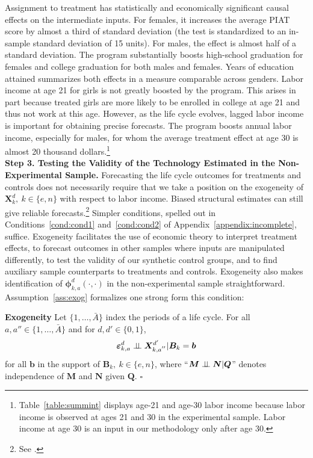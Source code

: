 Assignment to treatment has statistically and economically significant causal effects on the intermediate inputs. For females, it increases the average PIAT score by almost a third of standard deviation (the test is standardized to an in-sample standard deviation of 15 units). For males, the effect is almost half of a standard deviation. The program substantially boosts high-school graduation for females and college graduation for both males and females. Years of education attained summarizes both effects in a measure comparable across genders. Labor income at age 21 for girls is not greatly boosted by the program. This arises in part because treated girls are more likely to be enrolled in college at age 21 and thus not work at this age. However, as the life cycle evolves, lagged labor income is important for obtaining precise forecasts. The program boosts annual labor income, especially for males, for whom the average treatment effect at age 30 is almost 20 thousand dollars.\footnote{Table~\ref{table:summint} displays age-21 and age-30 labor income because labor income is observed at ages 21 and 30 in the experimental sample. Labor income at age 30 is an input in our methodology only after age 30.}\\

\noindent \textbf{Step 3. Testing the Validity of the Technology Estimated in the Non-Experimental Sample.} Forecasting the life cycle outcomes for treatments and controls does not necessarily require that we take a position on the exogeneity of $\bm{X}^d_k, \: k \in \{e,n\}$ with respect to labor income. Biased structural estimates can still give reliable forecasts.\footnote{See \cite{Liu-etal-2016-USC-Data-Models}.} Simpler conditions, spelled out in Conditions~\ref{cond:cond1} and~\ref{cond:cond2} of Appendix~\ref{appendix:incomplete}, suffice. Exogeneity facilitates the use of economic theory to interpret treatment effects, to forecast outcomes in other samples where inputs are manipulated differently, to test the validity of our synthetic control groups, and to find auxiliary sample counterparts to treatments and controls. Exogeneity also makes identification of $\bm{\phi}^d_{k,a}\left( \cdot, \cdot \right)$ in the non-experimental sample straightforward. Assumption~\ref{ass:exog} formalizes one strong form this condition:

\onehalfspacing
\begin{assumption}\label{ass:exog} \textbf{Exogeneity}
Let $\{ 1, \ldots, \bar{A} \}$ index the periods of a life cycle. For all $a, a'' \in \{ 1, \ldots, \bar{A} \}$ and for $d, d' \in \{0,1\}$,
\begin{equation}
\bm{\varepsilon}^d_{k,a} \perp\!\!\!\perp \bm{X}^{d^{\prime}}_{k,a^{''}} | \bm{B}_k = \bm{b}
\end{equation}
for all $\bm{b}$ in the support of $\bm{B}_k, \: k \in \{e,n\}$, where ``$\bm{M} \perp\!\!\!\perp \bm{N}|\bm{Q}$'' denotes independence of $\bm{M}$ and $\bm{N}$ given $\bm{Q}$. $\square$
\end{assumption}
\doublespacing


